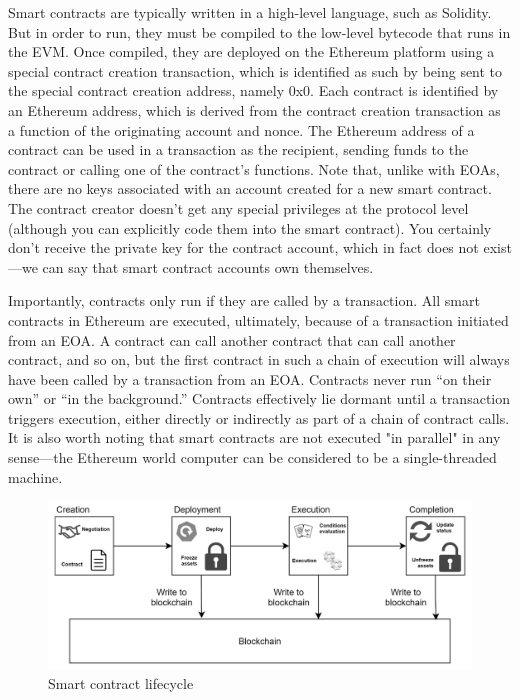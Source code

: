 Smart contracts are typically written in a high-level language, such as Solidity. But in order to run, they must be compiled to the low-level bytecode that runs in the EVM. Once compiled, they are deployed on the Ethereum platform using a special contract creation transaction, which is identified as such by being sent to the special contract creation address, namely 0x0. Each contract is identified by an Ethereum address, which is derived from the contract creation transaction as a function of the originating account and nonce. The Ethereum address of a contract can be used in a transaction as the recipient, sending funds to the contract or calling one of the contract’s functions. Note that, unlike with EOAs, there are no keys associated with an account created for a new smart contract. The contract creator doesn't get any special privileges at the protocol level (although you can explicitly code them into the smart contract). You certainly don’t receive the private key for the contract account, which in fact does not exist—we can say that smart contract accounts own themselves\cite{antonopoulosMasteringEthereumBuilding2018}.

Importantly, contracts only run if they are called by a transaction. All smart contracts in Ethereum are executed, ultimately, because of a transaction initiated from an EOA. A contract can call another contract that can call another contract, and so on, but the first contract in such a chain of execution will always have been called by a transaction from an EOA. Contracts never run “on their own” or “in the background.” Contracts effectively lie dormant until a transaction triggers execution, either directly or indirectly as part of a chain of contract calls. It is also worth noting that smart contracts are not executed "in parallel" in any sense—the Ethereum world computer can be considered to be a single-threaded machine\cite{antonopoulosMasteringEthereumBuilding2018}.

\begin{figure}[H]
	\centering
		\includegraphics[width=12cm]{images/chapter2/smart-contract-lifecycle.png}
		\caption{{\footnotesize Smart contract lifecycle\cite{alvaresBlockchainBasedSolutionsUAVAssisted2021}}}
\end{figure}

